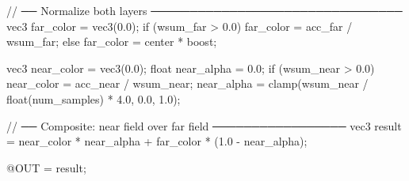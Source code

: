 {    // ── Normalize both layers ────────────────────────────────
    vec3 far_color = vec3(0.0);
    if (wsum_far > 0.0) {
        far_color = acc_far / wsum_far;
    } else {
        far_color = center * boost;
    }

    vec3 near_color = vec3(0.0);
    float near_alpha = 0.0;
    if (wsum_near > 0.0) {
        near_color = acc_near / wsum_near;
        near_alpha = clamp(wsum_near / float(num_samples) * 4.0, 0.0, 1.0);
    }

    // ── Composite: near field over far field ─────────────────
    vec3 result = near_color * near_alpha + far_color * (1.0 - near_alpha);

    @OUT = result;
}
